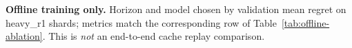 \begin{table}[t]
\centering
\caption{\textbf{Offline training only.} Horizon and model chosen by validation mean regret on heavy\_r1 shards; metrics match the corresponding row of Table~\ref{tab:offline-ablation}. This is \emph{not} an end-to-end cache replay comparison.}
\label{tab:offline-selection}

\end{table}
